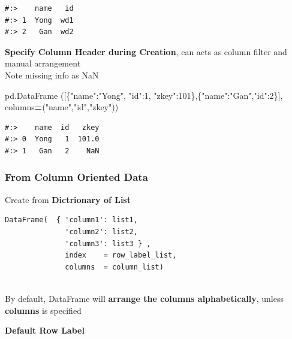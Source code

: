 \documentclass[
]{book}
\newenvironment{Shaded}{\begin{snugshade}}{\end{snugshade}}
\newcommand{\DecValTok}[1]{\textcolor[rgb]{0.06,0.06,0.06}{#1}}
\newcommand{\NormalTok}[1]{#1}
\newcommand{\OperatorTok}[1]{\textcolor[rgb]{0.43,0.43,0.43}{\textbf{#1}}}
\newcommand{\StringTok}[1]{\textcolor[rgb]{0.5,0.5,0.5}{#1}}
\begin{document}
\begin{verbatim}
#:>    name   id
#:> 1  Yong  wd1
#:> 2   Gan  wd2
\end{verbatim}

\textbf{Specify Column Header during Creation}, can acts as column filter and manual arrangement\\
Note missing info as NaN

\begin{Shaded}
\begin{Highlighting}[]
\NormalTok{pd.DataFrame ([\{}\StringTok{"name"}\NormalTok{:}\StringTok{"Yong"}\NormalTok{, }\StringTok{"id"}\NormalTok{:}\DecValTok{1}\NormalTok{, }\StringTok{"zkey"}\NormalTok{:}\DecValTok{101}\NormalTok{\},\{}\StringTok{"name"}\NormalTok{:}\StringTok{"Gan"}\NormalTok{,}\StringTok{"id"}\NormalTok{:}\DecValTok{2}\NormalTok{\}], }
\NormalTok{              columns}\OperatorTok{=}\NormalTok{(}\StringTok{"name"}\NormalTok{,}\StringTok{"id"}\NormalTok{,}\StringTok{"zkey"}\NormalTok{))}
\end{Highlighting}
\end{Shaded}

\begin{verbatim}
#:>    name  id   zkey
#:> 0  Yong   1  101.0
#:> 1   Gan   2    NaN
\end{verbatim}

\hypertarget{from-column-oriented-data}{%
\subsubsection{From Column Oriented Data}\label{from-column-oriented-data}}

Create from \textbf{Dictrionary of List}

\begin{verbatim}
DataFrame(  { 'column1': list1,
              'column2': list2,
              'column3': list3 } , 
              index    = row_label_list, 
              columns  = column_list)
              
\end{verbatim}

By default, DataFrame will \textbf{arrange the columns alphabetically}, unless \textbf{columns} is specified

\textbf{Default Row Label}
\end{document}
